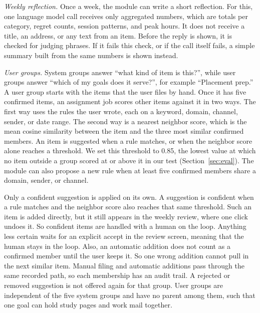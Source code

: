 \documentclass[conference]{IEEEtran}
\begin{document}
\textit{Weekly reflection.} Once a week, the module can write a short reflection. For this, one language model call receives only aggregated numbers, which are totals per category, regret counts, session patterns, and peak hours. It does not receive a title, an address, or any text from an item. Before the reply is shown, it is checked for judging phrases. If it fails this check, or if the call itself fails, a simple summary built from the same numbers is shown instead.

\textit{User groups.} System groups answer ``what kind of item is this?'', while user groups answer ``which of my goals does it serve?'', for example ``Placement prep.'' A user group starts with the items that the user files by hand. Once it has five confirmed items, an assignment job scores other items against it in two ways. The first way uses the rules the user wrote, each on a keyword, domain, channel, sender, or date range. The second way is a nearest neighbor score, which is the mean cosine similarity between the item and the three most similar confirmed members. An item is suggested when a rule matches, or when the neighbor score alone reaches a threshold. We set this threshold to 0.85, the lowest value at which no item outside a group scored at or above it in our test (Section~\ref{sec:eval}). The module can also propose a new rule when at least five confirmed members share a domain, sender, or channel.

Only a confident suggestion is applied on its own. A suggestion is confident when a rule matches and the neighbor score also reaches that same threshold. Such an item is added directly, but it still appears in the weekly review, where one click undoes it. So confident items are handled with a human on the loop. Anything less certain waits for an explicit accept in the review screen, meaning that the human stays in the loop. Also, an automatic addition does not count as a confirmed member until the user keeps it. So one wrong addition cannot pull in the next similar item. Manual filing and automatic additions pass through the same recorded path, so each membership has an audit trail. A rejected or removed suggestion is not offered again for that group. User groups are independent of the five system groups and have no parent among them, such that one goal can hold study pages and work mail together.

\end{document}
